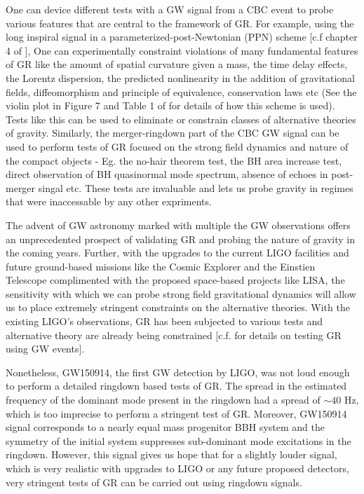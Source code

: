 One can device different tests with a GW signal from a CBC event to probe various features that are central to the framework of GR. For example, using the long inspiral signal in a parameterized-post-Newtonian (PPN) scheme [c.f chapter 4 of \cite{CliffWills_book}], One can experimentally constraint  violations of many fundamental features of GR like the amount of spatial curvature given a mass, the time delay effects, the Lorentz dispersion, the predicted nonlinearity in the addition of gravitational fields, diffeomorphism and principle of equivalence, conservation laws etc (See the violin plot in Figure 7 and Table 1 of \cite{TheLIGOScientific:2016src} for details of how this scheme is used). Tests like this can be used to eliminate or constrain classes of alternative theories of gravity. Similarly, the merger-ringdown part of the CBC GW signal can be used to perform tests of GR focused on the strong field dynamics and nature of the compact objects \cite{Mazur:2000pn,misner1973gravitation,Dreyer,Gossan,Kamaretsos}- Eg. the no-hair theorem test, the BH area increase test, direct observation of BH quasinormal mode spectrum, absence of echoes in post-merger singal etc. These tests are invaluable and lets us probe gravity in regimes that were inaccessable by any other expriments.  

The advent of GW astronomy marked with multiple the GW observations \cite{TheLIGOScientific:2016pea} offers an unprecedented prospect of validating GR and probing the nature of gravity in the coming years. Further, with the upgrades to the current LIGO facilities and future ground-based missions like the Cosmic Explorer and the Einstien Telescope complimented with the proposed space-based projects like LISA, the sensitivity with which we can probe strong field gravitational dynamics will allow us to place extremely stringent constraints on the alternative theories. With the existing LIGO's observations, GR has been subjected to various tests and alternative theory are already being constrained [c.f. \cite{Yunes:2016jcc,TheLIGOScientific:2016src,2016arXiv160308955Y} for details on testing GR using GW events]. 

Nonetheless, GW150914, the first GW detection by LIGO, was not loud enough to perform a detailed ringdown based tests of GR. The spread in the estimated frequency of the dominant mode present in the ringdown had a spread of $\sim 40$ Hz, which is too imprecise to perform a stringent test of GR. Moreover, GW150914 signal corresponds to a nearly equal mass progenitor BBH system and the symmetry of the initial system suppresses sub-dominant mode excitations in the ringdown. However, this signal gives us hope that for a slightly louder signal, which is very realistic with upgrades to LIGO or any future proposed detectors, very stringent tests of GR can be carried out using ringdown signals. 

